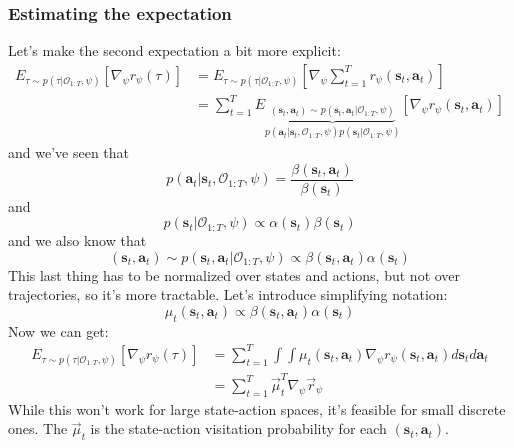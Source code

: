 \documentclass{report}
\begin{document}
\subsubsection{Estimating the expectation}
Let's make the second expectation a bit more explicit:
\begin{align}
E_{ \tau \sim p (\tau|\mathcal{O}_{ 1:T }, \psi) } \left[ \nabla_{ \psi } r_{ \psi } (\tau) \right] &=
E_{ \tau \sim p (\tau|\mathcal{O}_{ 1:T }, \psi) }
\left[ \nabla_{ \psi } \sum_{t=1}^{T} r_{ \psi } (\bm{s}_{t}, \bm{a}_{t} ) \right] \\
&= \sum_{t=1}^{T} 
E\underbrace{_{ (\bm{s}_{t}, \bm{a}_{t} ) \sim p (\bm{s}_{t}, \bm{a}_{t} | \mathcal{O}_{ 1:T }, \psi) }}_{ 
p (\bm{a}_{t}|\bm{s}_{t}, \mathcal{O}_{ 1:T },\psi) p (\bm{s}_{t}|\mathcal{O}_{ 1:T } , \psi)}
\left[ \nabla_{ \psi }r_{ \psi } (\bm{s}_{t}, \bm{a}_{t} ) \right] 
\end{align}
and we've seen that 
\begin{equation}
	p (\bm{a}_{t}|\bm{s}_{t}, \mathcal{O}_{ 1:T },\psi)
	= \frac{\beta (\bm{s}_{t}, \bm{a}_{t} )}{\beta (\bm{s}_{t})} 
\end{equation}
and 
\begin{equation}
		p (\bm{s}_{t}|\mathcal{O}_{ 1:T } , \psi) \propto \alpha (\bm{s}_{t}) \beta (\bm{s}_{t}) 
\end{equation}
and we also know that
\begin{equation}
		 (\bm{s}_{t}, \bm{a}_{t} ) \sim p (\bm{s}_{t}, \bm{a}_{t} | \mathcal{O}_{ 1:T }, \psi) 
		 \propto \beta (\bm{s}_{t}, \bm{a}_{t} ) \alpha (\bm{s}_{t})
\end{equation}
This last thing has to be normalized over states and actions, but not over trajectories,
so it's more tractable.
Let's introduce simplifying notation:
\begin{equation}
	\mu_{ t } (\bm{s}_{t}, \bm{a}_{t} )\propto \beta (\bm{s}_{t}, \bm{a}_{t} ) \alpha (\bm{s}_{t})	
\end{equation}
Now we can get:
\begin{align}
E_{ \tau \sim p (\tau|\mathcal{O}_{ 1:T }, \psi) } \left[ \nabla_{ \psi } r_{ \psi } (\tau) \right] &=
\sum_{t=1}^{T} \int \int \mu_{ t } (\bm{s}_{t}, \bm{a}_{t} ) \nabla_{ \psi }r_{ \psi } (\bm{s}_{t}, \bm{a}_{t} ) d\bm{s}_{t}d\bm{a}_{t} \\
&= \sum_{t=1}^{T} \vec{\mu}_{ t }^{ T }\nabla_{ \psi }\vec{r}_{ \psi }
\end{align}
While this won't work for large state-action spaces, it's feasible for small discrete ones.
The $ \vec{\mu}_{ t }$ is the state-action visitation probability for each $ (\bm{s}_{t}, \bm{a}_{t} )  $.
\end{document}
